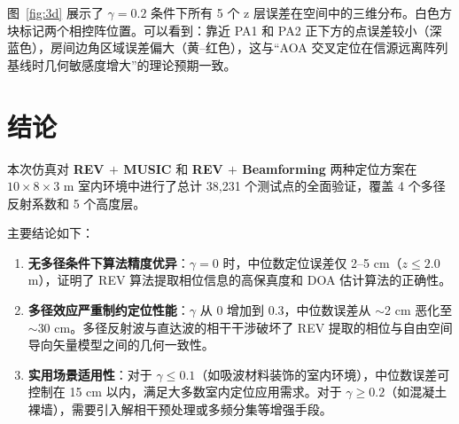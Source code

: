 \documentclass[12pt,a4paper]{ctexart}
\begin{document}
图~\ref{fig:3d} 展示了 $\gamma = 0.2$ 条件下所有 5 个 z 层误差在空间中的三维分布。白色方块标记两个相控阵位置。可以看到：靠近 PA1 和 PA2 正下方的点误差较小（深蓝色），房间边角区域误差偏大（黄--红色），这与“AOA 交叉定位在信源远离阵列基线时几何敏感度增大”的理论预期一致。

\section{结论}

本次仿真对 \textbf{REV $+$ MUSIC} 和 \textbf{REV $+$ Beamforming} 两种定位方案在 $10 \times 8 \times 3$ m 室内环境中进行了总计 38,231 个测试点的全面验证，覆盖 4 个多径反射系数和 5 个高度层。

主要结论如下：

\begin{enumerate}
    \item \textbf{无多径条件下算法精度优异}：$\gamma = 0$ 时，中位数定位误差仅 2--5 cm（$z \leq 2.0$ m），证明了 REV 算法提取相位信息的高保真度和 DOA 估计算法的正确性。
    
    \item \textbf{多径效应严重制约定位性能}：$\gamma$ 从 0 增加到 0.3，中位数误差从 $\sim$2 cm 恶化至 $\sim$30 cm。多径反射波与直达波的相干干涉破坏了 REV 提取的相位与自由空间导向矢量模型之间的几何一致性。
    
    \item \textbf{实用场景适用性}：对于 $\gamma \leq 0.1$（如吸波材料装饰的室内环境），中位数误差可控制在 15 cm 以内，满足大多数室内定位应用需求。对于 $\gamma \geq 0.2$（如混凝土裸墙），需要引入解相干预处理或多频分集等增强手段。
\end{enumerate}
\end{document}
